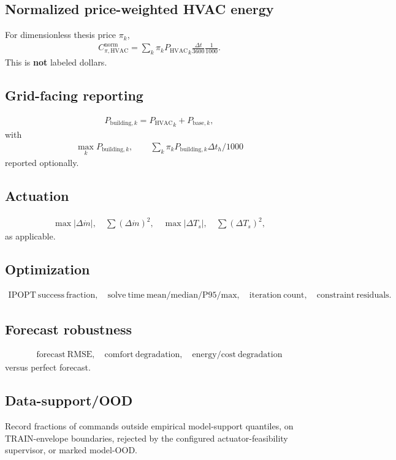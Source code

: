 \documentclass[11pt]{article}
\newcommand{\Ts}{T_s}
\newcommand{\mdot}{\dot m}
\newcommand{\PHVAC}{P_{\mathrm{HVAC}}}
\newcommand{\dt}{\Delta t}
\begin{document}
\subsection*{Normalized price-weighted HVAC energy}
For dimensionless thesis price \(\pi_k\),
\begin{align}
\boxed{
C_{\pi,\mathrm{HVAC}}^{\mathrm{norm}}
=
\sum_k
\pi_k
{\PHVAC}_k
\frac{\dt}{3600}
\frac{1}{1000}.
}
\tag{6.80}
\end{align}
This is \textbf{not} labeled dollars.

\subsection*{Grid-facing reporting}
\begin{align}
P_{\mathrm{building},k}
=
{\PHVAC}_k+P_{\mathrm{base},k},
\end{align}
with
\begin{align}
\max_k P_{\mathrm{building},k},
\qquad
\sum_k\pi_kP_{\mathrm{building},k}\dt_h/1000
\end{align}
reported optionally.

\subsection*{Actuation}
\begin{align}
\max|\Delta\mdot|,
\quad
\sum(\Delta\mdot)^2,
\quad
\max|\Delta\Ts|,
\quad
\sum(\Delta\Ts)^2,
\end{align}
as applicable.

\subsection*{Optimization}
\begin{align}
\mathrm{IPOPT\ success\ fraction},
\quad
\mathrm{solve\ time\ mean/median/P95/max},
\quad
\mathrm{iteration\ count},
\quad
\mathrm{constraint\ residuals}.
\end{align}

\subsection*{Forecast robustness}
\begin{align}
\mathrm{forecast\ RMSE},
\quad
\mathrm{comfort\ degradation},
\quad
\mathrm{energy/cost\ degradation}
\end{align}
versus perfect forecast.

\subsection*{Data-support/OOD}
Record fractions of commands outside empirical model-support quantiles, on TRAIN-envelope
boundaries, rejected by the configured actuator-feasibility supervisor, or marked model-OOD.
\end{document}
